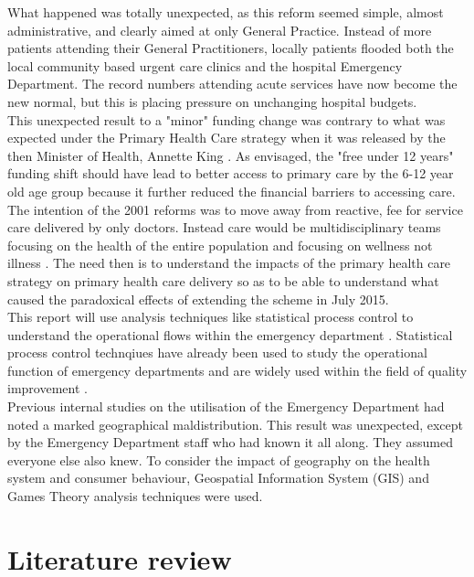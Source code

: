 \documentclass[11pt,a4paper]{article}
\begin{document}
What happened was totally unexpected, as this reform seemed simple, almost administrative, and clearly aimed at only General Practice. Instead of more patients  attending their General Practitioners, locally patients flooded both the local community based urgent care clinics and the hospital Emergency Department. The record numbers attending acute services have now become the new normal, but this is placing pressure on unchanging hospital budgets. \\

This unexpected result to a "minor" funding change was contrary to what was expected under the Primary Health Care strategy when it was released by the then Minister of Health, Annette King \citep{king2001primary}. As envisaged, the "free under 12 years" funding shift should have lead to better access to primary care by the 6-12 year old age group because it further reduced the financial barriers to accessing care. The intention of the 2001 reforms was to move away from reactive, fee for service care delivered by only doctors. Instead care would be multidisciplinary teams focusing on the health of the entire population and focusing on wellness not illness \citep{king2001primary}.  The need then is to understand the impacts of the primary health care strategy on primary health care delivery so as to be able to understand what caused the paradoxical effects of extending the scheme in July 2015.\\

This report will use analysis techniques like statistical process control to understand the operational flows within the emergency department \citep{rosemann2015six, cheng2015run, epprecht2015statistical}. Statistical process control technqiues have already been used to study the operational function of emergency departments \citep{pimentel2015statistical} and are widely used within the field of quality improvement \citep{provost2011health}.\\

Previous internal studies on the utilisation of the Emergency Department had noted a marked geographical maldistribution. This result was unexpected, except by the Emergency Department staff who had known it all along. They assumed everyone else also knew. To consider the impact of geography on the health system and consumer behaviour, Geospatial Information System (GIS) and Games Theory analysis techniques were used.\\

\section{Literature review}
\end{document}
